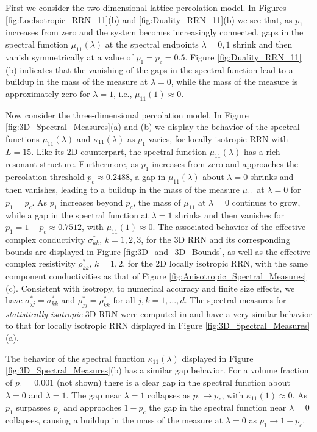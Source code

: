 \documentclass{cmslatex}
\begin{document}
First we consider the two-dimensional lattice percolation model. In
Figures \ref{fig:LocIsotropic_RRN_11}(b) and
\ref{fig:Duality_RRN_11}(b) we see that, as $p_1$ increases from zero 
and the system becomes increasingly connected, gaps in the spectral
function $\mu_{11}(\lambda)$ at the spectral endpoints $\lambda=0,1$ shrink and then
vanish  symmetrically at a value of $p_1=p_c=0.5$. Figure
\ref{fig:Duality_RRN_11}(b) indicates that the vanishing of the gaps
in the spectral function lead to a buildup in the mass of the measure at
$\lambda=0$, while the mass of the measure is approximately zero for $\lambda=1$,
i.e., $\mu_{11}(1)\approx0$.



Now consider the three-dimensional percolation model. In Figure
\ref{fig:3D_Spectral_Measures}(a) and (b) we display 
the behavior of the spectral functions $\mu_{11}(\lambda)$ and $\kappa_{11}(\lambda)$
as $p_1$ varies, for locally isotropic RRN with $L=15$. Like its
2D counterpart, the spectral function $\mu_{11}(\lambda)$ has a rich resonant
structure. Furthermore, as $p_1$ increases from zero and approaches
the percolation threshold $p_c\approx0.2488$, a gap in $\mu_{11}(\lambda)$ about
$\lambda=0$ shrinks and then vanishes, leading to a buildup in the mass of
the measure $\mu_{11}$ at $\lambda=0$ for 
$p_1=p_c$. As $p_1$ increases beyond $p_c$, the mass of $\mu_{11}$ at
$\lambda=0$ continues to grow, while a gap in the spectral function at $\lambda=1$ 
shrinks and then vanishes for $p_1=1-p_c\approx0.7512$, with
$\mu_{11}(1)\approx0$. The associated behavior of the effective complex
conductivity $\sigma^*_{kk}$, $k=1,2,3$, for the 3D 
RRN and its corresponding bounds are displayed in Figure
\ref{fig:3D_and_3D_Bounds}, as well as the effective complex
resistivity $\rho^*_{kk}$, $k=1,2$, for the 2D locally isotropic RRN,
with the same component conductivities as that of Figure
\ref{fig:Anisotropic_Spectral_Measures}(c). Consistent with isotropy,
to numerical accuracy and finite size effects, we have
$\sigma^*_{jj}=\sigma^*_{kk}$ and $\rho^*_{jj}=\rho^*_{kk}$ for all $j,k=1,\ldots,d$. The spectral measures for
\emph{statistically isotropic} 3D RRN  were computed in
\cite{Murphy:JMP:063506} and have a very similar behavior to that for
locally isotropic RRN displayed in Figure
\ref{fig:3D_Spectral_Measures}(a).    



The behavior of the spectral function $\kappa_{11}(\lambda)$ displayed in Figure
\ref{fig:3D_Spectral_Measures}(b) has a similar gap behavior. For a
volume fraction of $p_1=0.001$ (not shown) there is a clear gap in the
spectral function about $\lambda=0$ and $\lambda=1$. The gap near $\lambda=1$ collapses
as $p_1\to p_c$, with $\kappa_{11}(1)\approx0$. As $p_1$ surpasses $p_c$ and
approaches $1-p_c$ the gap in the spectral function near $\lambda=0$
collapses, causing a buildup in the mass of the measure at $\lambda=0$ as
$p_1\to1-p_c$. 
\end{document}
